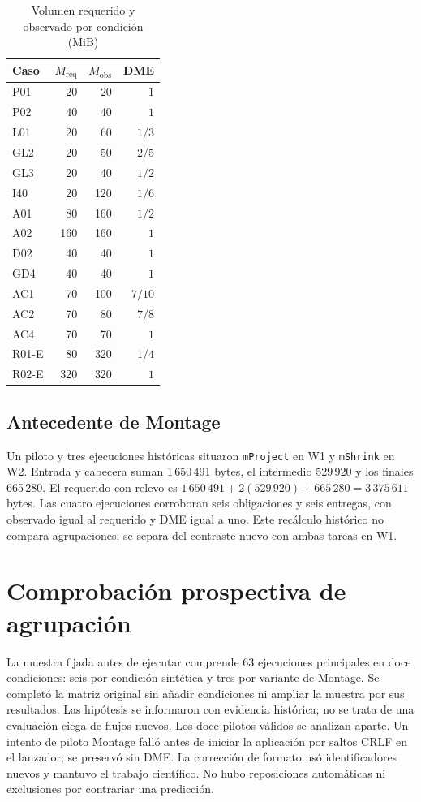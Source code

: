 \begin{table}[htbp]\centering\small
\caption{Volumen requerido y observado por condición (MiB)}
\label{tab:referencia_relevo}
\begin{tabular}{@{}lrrr@{}}
\toprule Caso & $M_{\mathrm{req}}$ & $M_{\mathrm{obs}}$ & DME\\\midrule
P01 & 20 & 20 & $1$\\
P02 & 40 & 40 & $1$\\
L01 & 20 & 60 & $1/3$\\
GL2 & 20 & 50 & $2/5$\\
GL3 & 20 & 40 & $1/2$\\
I40 & 20 & 120 & $1/6$\\
A01 & 80 & 160 & $1/2$\\
A02 & 160 & 160 & $1$\\
D02 & 40 & 40 & $1$\\
GD4 & 40 & 40 & $1$\\
AC1 & 70 & 100 & $7/10$\\
AC2 & 70 & 80 & $7/8$\\
AC4 & 70 & 70 & $1$\\
R01-E & 80 & 320 & $1/4$\\
R02-E & 320 & 320 & $1$\\
\bottomrule\end{tabular}\end{table}

\subsection{Antecedente de Montage}
\label{sec:montage}
Un piloto y tres ejecuciones históricas situaron \texttt{mProject} en W1 y \texttt{mShrink} en W2. Entrada y cabecera suman 1\,650\,491 bytes, el intermedio 529\,920 y los finales 665\,280. El requerido con relevo es $1\,650\,491+2(529\,920)+665\,280=3\,375\,611$ bytes. Las cuatro ejecuciones corroboran seis obligaciones y seis entregas, con observado igual al requerido y DME igual a uno. Este recálculo histórico no compara agrupaciones; se separa del contraste nuevo con ambas tareas en W1.

\section{Comprobación prospectiva de agrupación}
\label{sec:prospectiva}
La muestra fijada antes de ejecutar comprende 63 ejecuciones principales en doce condiciones: seis por condición sintética y tres por variante de Montage. Se completó la matriz original sin añadir condiciones ni ampliar la muestra por sus resultados. Las hipótesis se informaron con evidencia histórica; no se trata de una evaluación ciega de flujos nuevos. Los doce pilotos válidos se analizan aparte. Un intento de piloto Montage falló antes de iniciar la aplicación por saltos CRLF en el lanzador; se preservó sin DME. La corrección de formato usó identificadores nuevos y mantuvo el trabajo científico. No hubo reposiciones automáticas ni exclusiones por contrariar una predicción.

